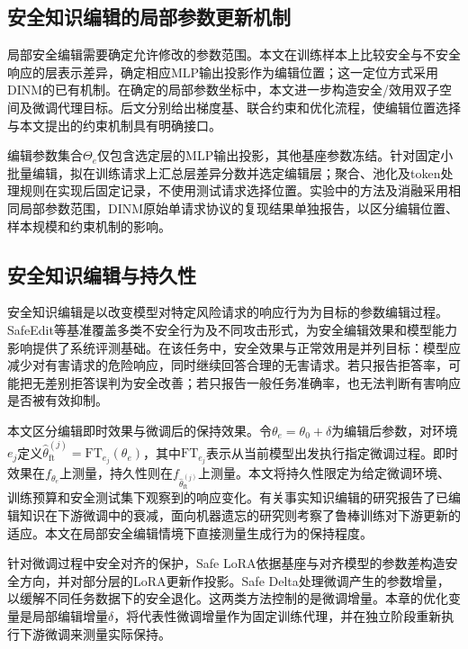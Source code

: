 \subsection{安全知识编辑的局部参数更新机制}

局部安全编辑需要确定允许修改的参数范围。本文在训练样本上比较安全与不安全响应的层表示差异，确定相应MLP输出投影作为编辑位置；这一定位方式采用DINM的已有机制\cite{wang2024safeedit}。在确定的局部参数坐标中，本文进一步构造安全/效用双子空间及微调代理目标。后文分别给出梯度基、联合约束和优化流程，使编辑位置选择与本文提出的约束机制具有明确接口。

编辑参数集合$\Theta_e$仅包含选定层的MLP输出投影，其他基座参数冻结。针对固定小批量编辑，拟在训练请求上汇总层差异分数并选定编辑层；聚合、池化及token处理规则在实现后固定记录，不使用测试请求选择位置。实验中的方法及消融采用相同局部参数范围，DINM原始单请求协议的复现结果单独报告，以区分编辑位置、样本规模和约束机制的影响。

\subsection{安全知识编辑与持久性}

安全知识编辑是以改变模型对特定风险请求的响应行为为目标的参数编辑过程。SafeEdit等基准覆盖多类不安全行为及不同攻击形式，为安全编辑效果和模型能力影响提供了系统评测基础\cite{wang2024safeedit}。在该任务中，安全效果与正常效用是并列目标：模型应减少对有害请求的危险响应，同时继续回答合理的无害请求。若只报告拒答率，可能把无差别拒答误判为安全改善；若只报告一般任务准确率，也无法判断有害响应是否被有效抑制。

本文区分编辑即时效果与微调后的保持效果。令$\theta_e=\theta_0+\delta$为编辑后参数，对环境$e_j$定义$\widehat{\theta}_{\mathrm{ft}}^{(j)}=\mathrm{FT}_{e_j}(\theta_e)$，其中$\mathrm{FT}_{e_j}$表示从当前模型出发执行指定微调过程。即时效果在$f_{\theta_e}$上测量，持久性则在$f_{\widehat{\theta}_{\mathrm{ft}}^{(j)}}$上测量。本文将持久性限定为给定微调环境、训练预算和安全测试集下观察到的响应变化。有关事实知识编辑的研究报告了已编辑知识在下游微调中的衰减\cite{cheng2025finetune,wen2025retention}，面向机器遗忘的研究则考察了鲁棒训练对下游更新的适应\cite{wang2025ilu}。本文在局部安全编辑情境下直接测量生成行为的保持程度。

针对微调过程中安全对齐的保护，Safe LoRA依据基座与对齐模型的参数差构造安全方向，并对部分层的LoRA更新作投影\cite{hsu2024safelora}。Safe Delta处理微调产生的参数增量，以缓解不同任务数据下的安全退化\cite{lu2025safedelta}。这两类方法控制的是微调增量。本章的优化变量是局部编辑增量$\delta$，将代表性微调增量作为固定训练代理，并在独立阶段重新执行下游微调来测量实际保持。

